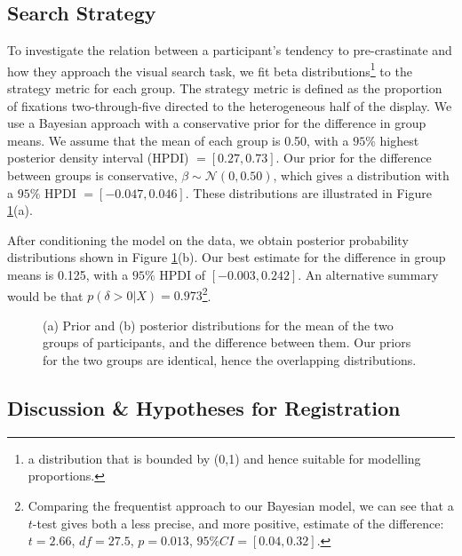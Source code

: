 \documentclass[]{rsos}
\begin{document}
\subsection{Search Strategy}
To investigate the relation between a participant's tendency to pre-crastinate and how they approach the visual search task, we fit beta distributions\footnote{a distribution that is bounded by (0,1) and hence suitable for modelling proportions.} to the strategy metric for each group. The strategy metric is defined as the proportion of fixations two-through-five directed to the heterogeneous half of the display. We use a Bayesian approach with a conservative prior for the difference in group means. We assume that the mean of each group is 0.50, with a $95\%$ highest posterior density interval (HPDI) $= [0.27, 0.73]$. Our prior for the difference between groups is conservative, $\beta \sim\mathcal{N}(0, 0.50)$, which gives a distribution with a $95\%$ HPDI $=[-0.047, 0.046]$. These distributions are illustrated in Figure \ref{fig:exp1_strategy}(a).

After conditioning the model on the data, we obtain posterior probability distributions shown in Figure \ref{fig:exp1_strategy}(b). Our best estimate for the difference in group means is 0.125, with a $95\%$ HPDI of $[-0.003, 0.242]$. An alternative summary would be that $p(\delta >0 | X)  = 0.973$\footnote{Comparing the frequentist approach to our Bayesian model, we can see that a $t$-test gives both a less precise, and more positive, estimate of the difference: $t=2.66$, $df = 27.5$, $p=0.013$, $95\%CI = [0.04, 0.32]$.}.

\begin{figure}[t]
  \centering  
  \caption{(a) Prior and (b) posterior distributions for the mean of the two groups of participants, and the difference between them. Our priors for the two groups are identical, hence the overlapping distributions.}
  \label{fig:exp1_strategy}
\end{figure}

\subsection{Discussion \& Hypotheses for Registration}
\end{document}
